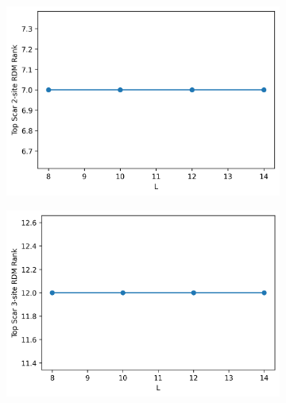 \documentclass[11pt]{article}
\begin{document}
\begin{itemize}
\begin{itemize}
\begin{figure}[H]
    \centering
    \begin{subfigure}{0.45\textwidth}
        \includegraphics[width=\linewidth]{xy_scar_2p.png}
        \caption{}
        \label{fig:image1pxy}
    \end{subfigure}
    \begin{subfigure}{0.45\textwidth}
        \includegraphics[width=\linewidth]{xy_scar_3p.png}
        \caption{}
        \label{fig:image2pxy}
    \end{subfigure}    %
    \begin{subfigure}{0.45\textwidth}

\end{subfigure}
\end{figure}
\end{itemize}
\end{itemize}
\end{document}

